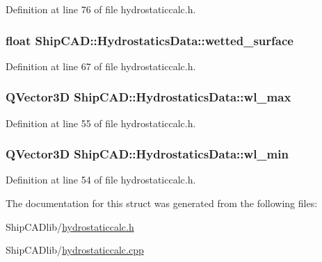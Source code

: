 Definition at line 76 of file hydrostaticcalc.\-h.

\hypertarget{structShipCAD_1_1HydrostaticsData_ad4b78176732ea80000adb94b5b5669f3}{
\subsubsection[{wetted\-\_\-surface}]{\setlength{\rightskip}{0pt plus 5cm}float Ship\-C\-A\-D\-::\-Hydrostatics\-Data\-::wetted\-\_\-surface}}\label{structShipCAD_1_1HydrostaticsData_ad4b78176732ea80000adb94b5b5669f3}


Definition at line 67 of file hydrostaticcalc.\-h.

\hypertarget{structShipCAD_1_1HydrostaticsData_a332be807e8373521c238d82b9dcedc38}{
\subsubsection[{wl\-\_\-max}]{\setlength{\rightskip}{0pt plus 5cm}Q\-Vector3\-D Ship\-C\-A\-D\-::\-Hydrostatics\-Data\-::wl\-\_\-max}}\label{structShipCAD_1_1HydrostaticsData_a332be807e8373521c238d82b9dcedc38}


Definition at line 55 of file hydrostaticcalc.\-h.

\hypertarget{structShipCAD_1_1HydrostaticsData_a3bb2750b6306d9e8ae09bb4eebb1ed0c}{
\subsubsection[{wl\-\_\-min}]{\setlength{\rightskip}{0pt plus 5cm}Q\-Vector3\-D Ship\-C\-A\-D\-::\-Hydrostatics\-Data\-::wl\-\_\-min}}\label{structShipCAD_1_1HydrostaticsData_a3bb2750b6306d9e8ae09bb4eebb1ed0c}


Definition at line 54 of file hydrostaticcalc.\-h.



The documentation for this struct was generated from the following files\-:\begin{DoxyCompactItemize}
\item 
Ship\-C\-A\-Dlib/\hyperlink{hydrostaticcalc_8h}{hydrostaticcalc.\-h}\item 
Ship\-C\-A\-Dlib/\hyperlink{hydrostaticcalc_8cpp}{hydrostaticcalc.\-cpp}\end{DoxyCompactItemize}
